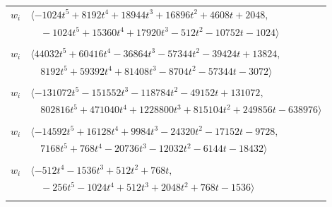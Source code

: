 \documentclass[11pt]{article}
\begin{document}
\begin{longtable}{@{}ll@{}}
$w_i$ & $\langle -1024t^{5}+8192t^{4}+18944t^{3}+16896t^{2}+4608t+2048,$\\
 & $\quad -1024t^{5}+15360t^{4}+17920t^{3}-512t^{2}-10752t-1024\rangle$\\
\addlinespace[2pt]
\multicolumn{2}{@{}p{0.97\textwidth}@{}}{$i=39$, $D_i=512$, $\rho_{ij}$: $2{:}1, \allowbreak 4{:}1, \allowbreak 6{:}1, \allowbreak 13{:}1, \allowbreak 24{:}2, \allowbreak 25{:}1, \allowbreak 43{:}2, \allowbreak 49{:}2, \allowbreak 54{:}2, \allowbreak 56{:}2, \allowbreak 59{:}2, \allowbreak 70{:}1$}\\
$w_i$ & $\langle 44032t^{5}+60416t^{4}-36864t^{3}-57344t^{2}-39424t+13824,$\\
 & $\quad 8192t^{5}+59392t^{4}+81408t^{3}-8704t^{2}-57344t-3072\rangle$\\
\addlinespace[2pt]
\multicolumn{2}{@{}p{0.97\textwidth}@{}}{$i=40$, $D_i=2048$, $\rho_{ij}$: $10{:}1, \allowbreak 14{:}2, \allowbreak 16{:}2, \allowbreak 17{:}2, \allowbreak 19{:}1, \allowbreak 23{:}2, \allowbreak 34{:}1, \allowbreak 37{:}1, \allowbreak 45{:}1, \allowbreak 56{:}2, \allowbreak 57{:}2, \allowbreak 59{:}1, \allowbreak 63{:}1, \allowbreak 69{:}1$}\\
$w_i$ & $\langle -131072t^{5}-151552t^{3}-118784t^{2}-49152t+131072,$\\
 & $\quad 802816t^{5}+471040t^{4}+1228800t^{3}+815104t^{2}+249856t-638976\rangle$\\
\addlinespace[2pt]
\multicolumn{2}{@{}p{0.97\textwidth}@{}}{$i=41$, $D_i=256$, $\rho_{ij}$: $1{:}1, \allowbreak 3{:}1, \allowbreak 12{:}2, \allowbreak 14{:}1, \allowbreak 16{:}1, \allowbreak 18{:}2, \allowbreak 28{:}2, \allowbreak 35{:}2, \allowbreak 55{:}2, \allowbreak 56{:}1$}\\
$w_i$ & $\langle -14592t^{5}+16128t^{4}+9984t^{3}-24320t^{2}-17152t-9728,$\\
 & $\quad 7168t^{5}+768t^{4}-20736t^{3}-12032t^{2}-6144t-18432\rangle$\\
\addlinespace[2pt]
\multicolumn{2}{@{}p{0.97\textwidth}@{}}{$i=42$, $D_i=256$, $\rho_{ij}$: $7{:}2, \allowbreak 12{:}2, \allowbreak 13{:}1, \allowbreak 22{:}2, \allowbreak 25{:}1, \allowbreak 26{:}2, \allowbreak 49{:}2, \allowbreak 56{:}2, \allowbreak 61{:}1, \allowbreak 64{:}1, \allowbreak 67{:}1$}\\
$w_i$ & $\langle -512t^{4}-1536t^{3}+512t^{2}+768t,$\\
 & $\quad -256t^{5}-1024t^{4}+512t^{3}+2048t^{2}+768t-1536\rangle$\\
\addlinespace[2pt]
\multicolumn{2}{@{}p{0.97\textwidth}@{}}{$i=43$, $D_i=4$, $\rho_{ij}$: $0{:}2, \allowbreak 1{:}1, \allowbreak 3{:}1, \allowbreak 6{:}1, \allowbreak 13{:}2, \allowbreak 14{:}2, \allowbreak 16{:}1, \allowbreak 19{:}2, \allowbreak 24{:}2, \allowbreak 35{:}2, \allowbreak 36{:}2, \allowbreak 39{:}1, \allowbreak 44{:}1, \allowbreak 60{:}2, \allowbreak 62{:}2$}\\

\end{longtable}
\end{document}
